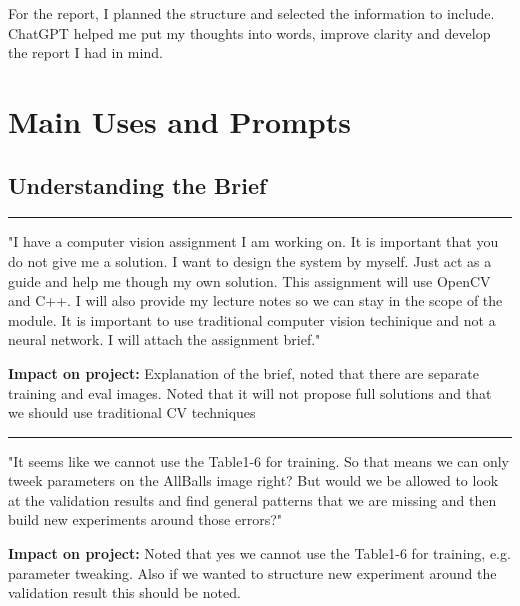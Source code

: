 \documentclass[12pt,a4paper]{article}
\newenvironment{promptentry}{%
    \par\Needspace{7\baselineskip}\addvspace{1.2em}
    \hrule
    \nobreak\vspace{0.5em}
}{\par\addvspace{0.5em}}
\newenvironment{aiprompt}{%
    \begin{list}{}{%
        \setlength{\leftmargin}{1em}%
        \setlength{\rightmargin}{1em}%
        \setlength{\topsep}{0.3em}%
        \setlength{\parsep}{0pt}%
    }%
    \item\relax
}{\end{list}}
\begin{document}
For the report, I planned the structure and selected the information to include. ChatGPT helped 
me put my thoughts into words, improve clarity and develop the report I had in mind.

\newpage

\section{Main Uses and Prompts}

\subsection{Understanding the Brief}

\begin{promptentry}

\begin{aiprompt}
"I have a computer vision assignment I am working on. It is important that
you do not give me a solution. I want to design the system by myself. Just act as a guide and help me though my own solution. 
This assignment will use OpenCV and C++. 
I will also provide my lecture notes so we can stay in the scope of the module.
It is important to use traditional computer vision techinique and not a neural network.
I will attach the assignment brief."
\end{aiprompt}

\textbf{Impact on project:} Explanation of the brief, noted that there are separate training and eval
images. Noted that it will not propose full solutions and that we should use traditional CV techniques

\end{promptentry}
\FloatBarrier

\begin{promptentry}

\begin{aiprompt}
"It seems like we cannot use the Table1-6 for training. So that means we can only tweek
parameters on the AllBalls image right? But would we be allowed to look at the validation results
and find general patterns that we are missing and then build new experiments around those errors?"
\end{aiprompt}

\textbf{Impact on project:} Noted that yes we cannot use the Table1-6 for training, e.g. parameter tweaking.
Also if we wanted to structure new experiment around the validation result this should be noted.

\end{promptentry}
\FloatBarrier
\end{document}
